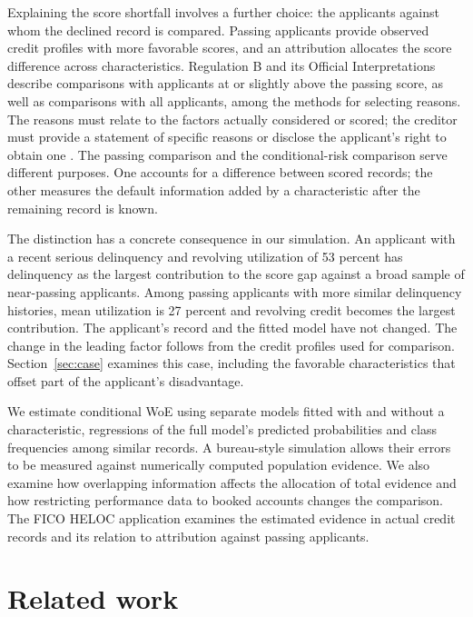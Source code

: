 Explaining the score shortfall involves a further choice: the applicants against whom the declined record is compared. Passing applicants provide observed credit profiles with more favorable scores, and an attribution allocates the score difference across characteristics. Regulation B and its Official Interpretations describe comparisons with applicants at or slightly above the passing score, as well as comparisons with all applicants, among the methods for selecting reasons. The reasons must relate to the factors actually considered or scored; the creditor must provide a statement of specific reasons or disclose the applicant's right to obtain one \citep{regb,interp}. The passing comparison and the conditional-risk comparison serve different purposes. One accounts for a difference between scored records; the other measures the default information added by a characteristic after the remaining record is known.

The distinction has a concrete consequence in our simulation. An applicant with a recent serious delinquency and revolving utilization of 53 percent has delinquency as the largest contribution to the score gap against a broad sample of near-passing applicants. Among passing applicants with more similar delinquency histories, mean utilization is 27 percent and revolving credit becomes the largest contribution. The applicant's record and the fitted model have not changed. The change in the leading factor follows from the credit profiles used for comparison. Section~\ref{sec:case} examines this case, including the favorable characteristics that offset part of the applicant's disadvantage.

We estimate conditional WoE using separate models fitted with and without a characteristic, regressions of the full model's predicted probabilities and class frequencies among similar records. A bureau-style simulation allows their errors to be measured against numerically computed population evidence. We also examine how overlapping information affects the allocation of total evidence and how restricting performance data to booked accounts changes the comparison. The FICO HELOC application examines the estimated evidence in actual credit records and its relation to attribution against passing applicants.



\section{Related work}\label{sec:related}

